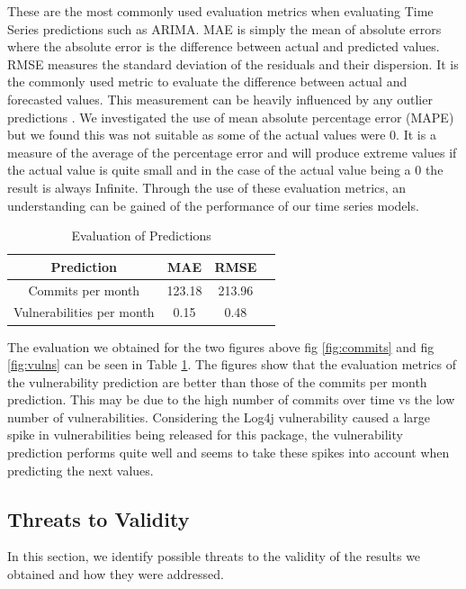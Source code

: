 \documentclass[conference]{IEEEtran}
\begin{document}
These are the most commonly used evaluation metrics when evaluating Time Series predictions such as ARIMA. MAE is simply the mean of absolute errors where the absolute error is the difference between actual and predicted values. RMSE measures the standard deviation of the residuals and their dispersion. It is the commonly used metric to evaluate the difference between actual and forecasted values. This measurement can be heavily influenced by any outlier predictions \cite{f_abdulhafidh_dael_performance_2022}. We investigated the use of mean absolute percentage error (MAPE) but we found this was not suitable as some of the actual values were 0. It is a measure of the average of the percentage error and will produce extreme values if the actual value is quite small and in the case of the actual value being a 0 the result is always Infinite. Through the use of these evaluation metrics, an understanding can be gained of the performance of our time series models. 

\begin{table}
 \caption{Evaluation of Predictions}
\label{evaluations}
\begin{center}
\begin{tabular}{|c|c|c|c|}
\hline
    \textbf{Prediction} & \textbf{MAE} & \textbf{RMSE} \\ \hline
    Commits per month & 123.18 & 213.96 \\ \hline
    Vulnerabilities per month & 0.15 & 0.48 \\ \hline
\end{tabular}
\end{center}
\end{table}

The evaluation we obtained for the two figures above fig \ref{fig:commits} and fig \ref{fig:vulns} can be seen in Table \ref{evaluations}. The figures show that the evaluation metrics of the vulnerability prediction are better than those of the commits per month prediction. This may be due to the high number of commits over time vs the low number of vulnerabilities. Considering the Log4j vulnerability caused a large spike in vulnerabilities being released for this package, the vulnerability prediction performs quite well and seems to take these spikes into account when predicting the next values. 

\subsection{Threats to Validity}
In this section, we identify possible threats to the validity of the results we obtained and how they were addressed. 
\end{document}
